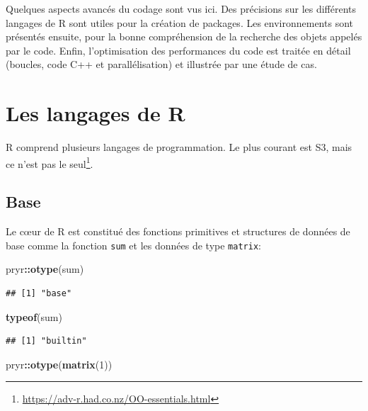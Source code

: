 \documentclass[
  12pt,
  french,
  a4paper,
  extrafontsizes,onecolumn,openright
  ]{memoir}
\newenvironment{Shaded}{\begin{snugshade}}{\end{snugshade}}
\newcommand{\DecValTok}[1]{\textcolor[rgb]{0.00,0.00,0.81}{#1}}
\newcommand{\FunctionTok}[1]{\textcolor[rgb]{0.13,0.29,0.53}{\textbf{#1}}}
\newcommand{\NormalTok}[1]{#1}
\newcommand{\SpecialCharTok}[1]{\textcolor[rgb]{0.81,0.36,0.00}{\textbf{#1}}}
\newlength{\rf}
\begin{document}
Quelques aspects avancés du codage sont vus ici.
Des précisions sur les différents langages de R sont utiles pour la création de packages.
Les environnements sont présentés ensuite, pour la bonne compréhension de la recherche des objets appelés par le code.
Enfin, l'optimisation des performances du code est traitée en détail (boucles, code C++ et parallélisation) et illustrée par une étude de cas.

\section{Les langages de R}\label{les-langages-de-r}

R comprend plusieurs langages de programmation.
Le plus courant est S3, mais ce n'est pas le seul\footnote{\url{https://adv-r.had.co.nz/OO-essentials.html}}.

\subsection{Base}\label{base}

Le cœur de R est constitué des fonctions primitives et structures de données de base comme la fonction \texttt{sum} et les données de type \texttt{matrix}:

\scriptsize

\begin{Shaded}
\begin{Highlighting}[]
\NormalTok{pryr}\SpecialCharTok{::}\FunctionTok{otype}\NormalTok{(sum)}
\end{Highlighting}
\end{Shaded}

\begin{verbatim}
## [1] "base"
\end{verbatim}

\begin{Shaded}
\begin{Highlighting}[]
\FunctionTok{typeof}\NormalTok{(sum)}
\end{Highlighting}
\end{Shaded}

\begin{verbatim}
## [1] "builtin"
\end{verbatim}

\begin{Shaded}
\begin{Highlighting}[]
\NormalTok{pryr}\SpecialCharTok{::}\FunctionTok{otype}\NormalTok{(}\FunctionTok{matrix}\NormalTok{(}\DecValTok{1}\NormalTok{))}
\end{Highlighting}
\end{Shaded}
\end{document}
